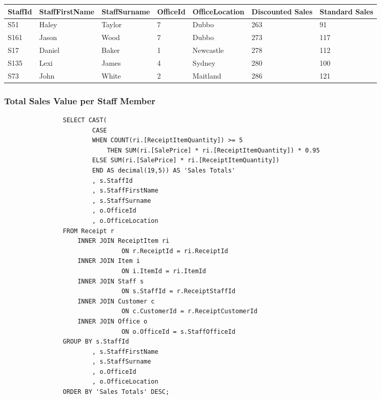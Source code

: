 \documentclass{article}
\begin{document}
            \begin{table}[H]
                \centering
                \begin{tabular}{|l|l|l|l|l|l|l|}
                \hline
                StaffId & StaffFirstName & StaffSurname & OfficeId & OfficeLocation & Discounted Sales & Standard Sales \\ \hline
                S51     & Haley          & Taylor       & 7        & Dubbo          & 263              & 91             \\ \hline
                S161    & Jason          & Wood         & 7        & Dubbo          & 273              & 117            \\ \hline
                S17     & Daniel         & Baker        & 1        & Newcastle      & 278              & 112            \\ \hline
                S135    & Lexi           & James        & 4        & Sydney         & 280              & 100            \\ \hline
                S73     & John           & White        & 2        & Maitland       & 286              & 121            \\ \hline
                \end{tabular}
                \end{table}

            \subsubsection{Total Sales Value per Staff Member}


            \begin{lstlisting}
				SELECT CAST(
						CASE
						WHEN COUNT(ri.[ReceiptItemQuantity]) >= 5
							THEN SUM(ri.[SalePrice] * ri.[ReceiptItemQuantity]) * 0.95
						ELSE SUM(ri.[SalePrice] * ri.[ReceiptItemQuantity])
						END AS decimal(19,5)) AS 'Sales Totals'
						, s.StaffId
						, s.StaffFirstName
						, s.StaffSurname
						, o.OfficeId
						, o.OfficeLocation
				FROM Receipt r
					INNER JOIN ReceiptItem ri
								ON r.ReceiptId = ri.ReceiptId
					INNER JOIN Item i
								ON i.ItemId = ri.ItemId
					INNER JOIN Staff s
								ON s.StaffId = r.ReceiptStaffId
					INNER JOIN Customer c
								ON c.CustomerId = r.ReceiptCustomerId
					INNER JOIN Office o
								ON o.OfficeId = s.StaffOfficeId
				GROUP BY s.StaffId
						, s.StaffFirstName
						, s.StaffSurname
						, o.OfficeId
						, o.OfficeLocation
				ORDER BY 'Sales Totals' DESC;
            \end{lstlisting}
\end{document}
